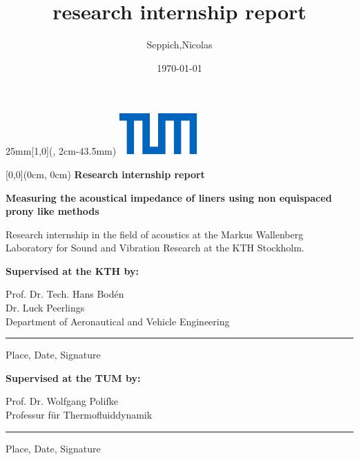 \documentclass[11pt]{report} %
\title{research internship report}
\date{\today}
\author{Seppich,Nicolas}
\newcommand{\SeitenrandOben}{43.5mm}
\newcommand{\UniversitaetLogoBreite}{25mm}
\newcommand{\Titel}{Research internship report}
\newcommand{\Untertitel}{Measuring the acoustical impedance of liners using non equispaced prony like methods}
\newcommand{\BetreutVonPersonKTHS}{%
    Dr. Luck Peerlings}
\newcommand{\BetreutVonPersonKTHP}{%
    Prof. Dr. Tech. Hans Bodén}
\newcommand{\BetreutVonPersonTUM}{%
    Prof. Dr. Wolfgang Polifke}
\newcommand{\BetreutVonLehrstuhlTUM}{%
    Professur für Thermofluiddynamik}
\newcommand{\BetreutVonLehrstuhlKTH}{%
    Department of Aeronautical and Vehicle Engineering}
\newcommand{\Ort}{%
    Place}
\newcommand{\Datum}{%
    Date}
\begin{document}
\begin{textblock*}{\UniversitaetLogoBreite}[1,0](\textwidth-1mm, 2cm-\SeitenrandOben)%
    \raggedleft\includegraphics{./Deckblatt/Ressourcen/Universitaet_Logo_RGB.pdf}%
\end{textblock*}

\begin{center}
\begin{textblock*}{\textwidth}[0,0](0cm, 0cm)%
{\fontsize{18pt}{27pt}\selectfont\textbf{\Titel}}

\vspace*{12pt}
{\fontsize{24pt}{26pt}\selectfont\textbf{\Untertitel}}
\end{textblock*}
\end{center}


\vspace*{40mm}
\fontsize{15pt}{17.5pt}\selectfont%
\begin{center}
Research internship in the field of acoustics at the Markus Wallenberg Laboratory for Sound and Vibration Research at the KTH Stockholm.
\end{center}

\renewcommand{\baselinestretch}{1.47}
\normalsize\selectfont
\vspace*{17.1mm}

\textbf{Supervised at the KTH by:}\tab 
\begin{minipage}[t]{\textwidth-\CurrentLineWidth}
\BetreutVonPersonKTHP\\
\BetreutVonPersonKTHS\\
\BetreutVonLehrstuhlKTH\strut
\end{minipage}
\vspace*{-1mm}

\rule[-3.7mm]{\linewidth}{0.5pt}
\Ort{}, \Datum{}, Signature

\vspace*{6.3mm}
\textbf{Supervised at the TUM by:}\tab 
\begin{minipage}[t]{\textwidth-\CurrentLineWidth}
\BetreutVonPersonTUM\\
\BetreutVonLehrstuhlTUM\strut
\end{minipage} 
\vspace*{-1mm}

\rule[-3.7mm]{\linewidth}{0.5pt}
\Ort{}, \Datum{}, Signature
\end{document}

